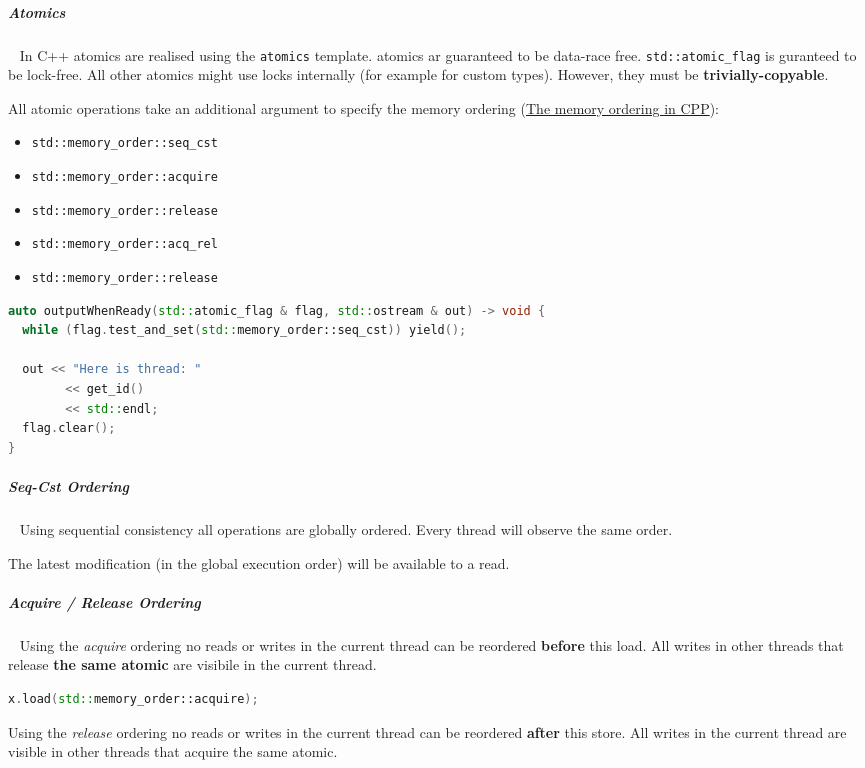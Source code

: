 \documentclass[11pt,twoside,landscape]{article}
\begin{document}
\begin{multicols}{2}
\subparagraph{Atomics} \
\label{sec:org0b7e74c}
In C++ atomics are realised using the \texttt{atomics} template.
atomics ar guaranteed to be data-race free.
\texttt{std::atomic\_flag} is guranteed to be lock-free.
All other atomics might use locks internally (for example for custom types).
However, they must be \textbf{trivially-copyable}.

All atomic operations take an additional argument to specify the memory ordering (\href{../../../roam/20230629160255-the_memory_ordering_in_cpp.org}{The memory ordering in CPP}):
\begin{itemize}
\item \texttt{std::memory\_order::seq\_cst}
\item \texttt{std::memory\_order::acquire}
\item \texttt{std::memory\_order::release}
\item \texttt{std::memory\_order::acq\_rel}
\item \texttt{std::memory\_order::release}
\end{itemize}


\begin{lstlisting}[language=c++,label=lst:example-for-atomic_flag,caption={Example for atomic\textsubscript{flag}},captionpos=b,numbers=none]
auto outputWhenReady(std::atomic_flag & flag, std::ostream & out) -> void {
  while (flag.test_and_set(std::memory_order::seq_cst)) yield();

  out << "Here is thread: "
        << get_id()
        << std::endl;
  flag.clear();
}
\end{lstlisting}

\subparagraph{Seq-Cst Ordering} \
\label{sec:org44670f4}
Using sequential consistency all operations are globally ordered.
Every thread will observe the same order.

The latest modification (in the global execution order) will be available to a read.

\subparagraph{Acquire / Release Ordering} \
\label{sec:org1a333af}
Using the \emph{acquire} ordering no reads or writes in the current thread can be reordered \textbf{before} this load.
All writes in other threads that release \textbf{the same atomic} are visibile in the current thread.

\begin{lstlisting}[language=c++,numbers=none]
x.load(std::memory_order::acquire);
\end{lstlisting}

Using the \emph{release} ordering no reads or writes in the current thread can be reordered \textbf{after} this store.
All writes in the current thread are visible in other threads that acquire the same atomic.


\end{multicols}
\end{document}
